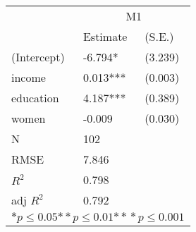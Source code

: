 \begin{tabular}{*{3}{l}}
\hline
                  & \multicolumn{2}{c}{M1}   \tabularnewline
                   &Estimate  &(S.E.)  \tabularnewline
 \hline
 \hline
   (Intercept)     &-6.794*   &   (3.239) \tabularnewline
   income          &0.013***   &   (0.003) \tabularnewline
   education       &4.187***   &   (0.389) \tabularnewline
   women           &-0.009   &   (0.030) \tabularnewline
 \hline
 N                 &102       &        \tabularnewline
 RMSE             &7.846         & \tabularnewline
 $R^2$             &0.798         & \tabularnewline
 adj $R^2$         &0.792         & \tabularnewline
 \hline
\hline
 
 \multicolumn{3}{c}{${*  p}\le 0.05$${*\!\!*  p}\le 0.01$${*\!\!*\!\!*  p}\le 0.001$}\tabularnewline
 \end{tabular}